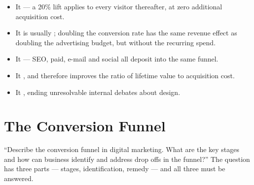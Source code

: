\documentclass{MMTextbook}
\begin{document}
\begin{keybox}
\begin{itemize}
\item It  --- a 20\% lift applies to every
      visitor thereafter, at zero additional acquisition cost.
\item It is usually ; doubling the
      conversion rate has the same revenue effect as doubling the advertising
      budget, but without the recurring spend.
\item It  --- SEO,
      paid, e-mail and social all deposit into the same funnel.
\item It , and therefore improves the ratio
      of lifetime value to acquisition cost.
\item It , ending unresolvable internal
      debates about design.
\end{itemize}
\end{keybox}

\section{The Conversion Funnel}

\begin{keybox}
``Describe the conversion funnel in digital marketing. What are the key stages and
how can business identify and address drop offs in the funnel?''
The question has three parts --- stages, identification, remedy --- and all three
must be answered.
\end{keybox}
\end{document}
